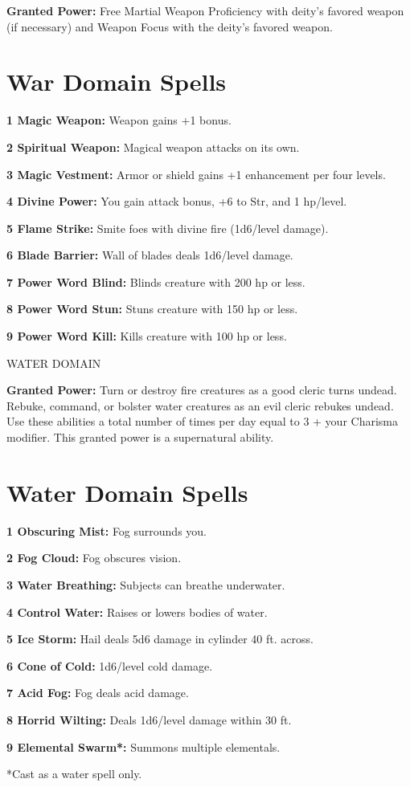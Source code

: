 \documentclass{article}
\begin{document}
\textbf{Granted Power:} Free Martial Weapon Proficiency with deity's favored weapon 
(if necessary) and Weapon Focus with the deity's favored weapon.

\section*{\textbf{War Domain Spells}}

\textbf{1 Magic Weapon:} Weapon gains +1 bonus.

\textbf{2 Spiritual Weapon: }Magical weapon attacks on its own.

\textbf{3 Magic Vestment: }Armor or shield gains +1 enhancement per four levels.

\textbf{4 Divine Power:} You gain attack bonus, +6 to Str, and 1 hp/level.

\textbf{5 Flame Strike:} Smite foes with divine fire (1d6/level damage).

\textbf{6 Blade Barrier:} Wall of blades deals 1d6/level damage.

\textbf{7 Power Word Blind: }Blinds creature with 200 hp or less.

\textbf{8 Power Word Stun: }Stuns creature with 150 hp or less.

\textbf{9 Power Word Kill: }Kills creature with 100 hp or less.

\vspace{12pt}
WATER DOMAIN

\textbf{Granted Power:} Turn or destroy fire creatures as a good cleric turns undead. 
Rebuke, command, or bolster water creatures as an evil cleric rebukes undead. Use 
these abilities a total number of times per day equal to 3 + your Charisma modifier. 
This granted power is a supernatural ability.

\section*{\textbf{Water Domain Spells}}

\textbf{1 Obscuring Mist:} Fog surrounds you.

\textbf{2 Fog Cloud: }Fog obscures vision.

\textbf{3 Water Breathing: }Subjects can breathe underwater.

\textbf{4 Control Water: }Raises or lowers bodies of water.

\textbf{5 Ice Storm: }Hail deals 5d6 damage in cylinder 40 ft. across.

\textbf{6 Cone of Cold:} 1d6/level cold damage.

\textbf{7 Acid Fog: }Fog deals acid damage.

\textbf{8 Horrid Wilting: }Deals 1d6/level damage within 30 ft.

\textbf{9 Elemental Swarm*:} Summons multiple elementals.

*Cast as a water spell only.

\newpage
\end{document}
